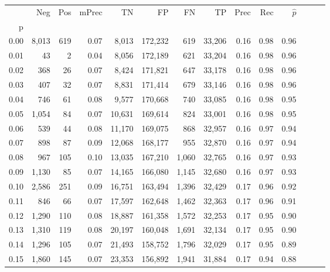 \begin{tabular}{rrrrrrrrrrrrrr}
\toprule
{} &    Neg &  Pos & mPrec &       TN &       FP &      FN &      TP &  Prec &   Rec & $\hat{p}$ \\
p    &        &      &       &          &          &         &         &       &       &           \\
\midrule
0.00 &  8,013 &  619 &  0.07 &    8,013 &  172,232 &     619 &  33,206 &  0.16 &  0.98 &      0.96 \\
0.01 &     43 &    2 &  0.04 &    8,056 &  172,189 &     621 &  33,204 &  0.16 &  0.98 &      0.96 \\
0.02 &    368 &   26 &  0.07 &    8,424 &  171,821 &     647 &  33,178 &  0.16 &  0.98 &      0.96 \\
0.03 &    407 &   32 &  0.07 &    8,831 &  171,414 &     679 &  33,146 &  0.16 &  0.98 &      0.96 \\
0.04 &    746 &   61 &  0.08 &    9,577 &  170,668 &     740 &  33,085 &  0.16 &  0.98 &      0.95 \\
0.05 &  1,054 &   84 &  0.07 &   10,631 &  169,614 &     824 &  33,001 &  0.16 &  0.98 &      0.95 \\
0.06 &    539 &   44 &  0.08 &   11,170 &  169,075 &     868 &  32,957 &  0.16 &  0.97 &      0.94 \\
0.07 &    898 &   87 &  0.09 &   12,068 &  168,177 &     955 &  32,870 &  0.16 &  0.97 &      0.94 \\
0.08 &    967 &  105 &  0.10 &   13,035 &  167,210 &   1,060 &  32,765 &  0.16 &  0.97 &      0.93 \\
0.09 &  1,130 &   85 &  0.07 &   14,165 &  166,080 &   1,145 &  32,680 &  0.16 &  0.97 &      0.93 \\
0.10 &  2,586 &  251 &  0.09 &   16,751 &  163,494 &   1,396 &  32,429 &  0.17 &  0.96 &      0.92 \\
0.11 &    846 &   66 &  0.07 &   17,597 &  162,648 &   1,462 &  32,363 &  0.17 &  0.96 &      0.91 \\
0.12 &  1,290 &  110 &  0.08 &   18,887 &  161,358 &   1,572 &  32,253 &  0.17 &  0.95 &      0.90 \\
0.13 &  1,310 &  119 &  0.08 &   20,197 &  160,048 &   1,691 &  32,134 &  0.17 &  0.95 &      0.90 \\
0.14 &  1,296 &  105 &  0.07 &   21,493 &  158,752 &   1,796 &  32,029 &  0.17 &  0.95 &      0.89 \\
0.15 &  1,860 &  145 &  0.07 &   23,353 &  156,892 &   1,941 &  31,884 &  0.17 &  0.94 &      0.88 \\

\end{tabular}
